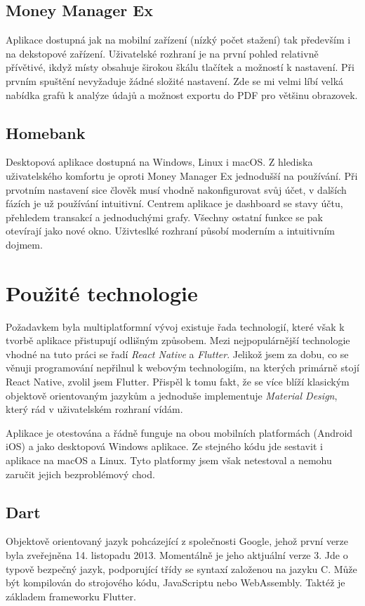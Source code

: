 \documentclass[
  biblatex,
  figures=false,
  tables=false,
  glossaries,
  index
]{kidiplom}
\begin{document}
\subsection{Money Manager Ex}
Aplikace dostupná jak na mobilní zařízení (nízký počet stažení) tak především i na dekstopové zařízení. Uživatelské rozhraní je na první pohled relativně přívětivé, ikdyž místy obsahuje širokou škálu tlačítek a možností k nastavení. Při prvním spuštění nevyžaduje žádné složité nastavení. Zde se mi velmi líbí velká nabídka grafů k analýze údajů a možnost exportu do PDF pro většinu obrazovek.

\subsection{Homebank}
Desktopová aplikace dostupná na Windows, Linux i macOS. Z hlediska uživatelského komfortu je oproti Money Manager Ex jednodušší na používání. Při prvotním nastavení sice člověk musí vhodně nakonfigurovat svůj účet, v dalších fázích je už používání intuitivní. Centrem aplikace je dashboard se stavy účtu, přehledem transakcí a jednoduchými grafy. Všechny ostatní funkce se pak otevírají jako nové okno. Uživteslké rozhraní působí moderním a intuitivním dojmem.

\section{Použité technologie}

Požadavkem byla multiplatformní vývoj existuje řada technologií, které však k tvorbě aplikace přistupují odlišným způsobem. Mezi nejpopulárnější technologie vhodné na tuto práci se řadí \textit{React Native} a \textit{Flutter}. Jelikož jsem za dobu, co se věnuji programování nepřilnul k webovým technologiím, na kterých primárně stojí React Native, zvolil jsem Flutter. Přispěl k tomu fakt, že se více blíží klasickým objektově orientovaným jazykům a jednoduše implementuje \textit{Material Design}, který rád v uživatelském rozhraní vídám.

Aplikace je otestována a řádně funguje na obou mobilních platformách (Android iOS) a jako desktopová Windows aplikace. Ze stejného kódu jde sestavit i aplikace na macOS a Linux. Tyto platformy jsem však netestoval a nemohu zaručit jejich bezproblémový chod.

\subsection{Dart}
Objektově orientovaný jazyk pohcázející z společnosti Google, jehož první verze byla zveřejněna 14. listopadu 2013. Momentálně je jeho aktjuální verze 3. Jde o typově bezpečný jazyk, podporující třídy se syntaxí založenou na jazyku C. Může být kompilován do strojového kódu, JavaScriptu nebo WebAssembly. Taktéž je základem frameworku Flutter.
\end{document}

